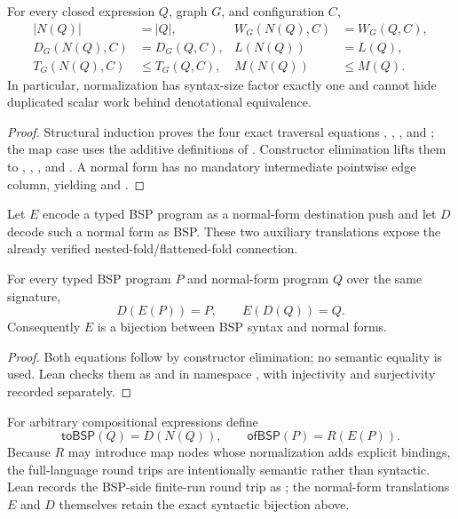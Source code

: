 \begin{theorem}
\label{thm:quantitative-normalization}
For every closed expression $Q$, graph $G$, and configuration $C$,
\[
\begin{aligned}
 |N(Q)| &= |Q|,&
 W_G(N(Q),C) &= W_G(Q,C),\\
 D_G(N(Q),C) &= D_G(Q,C),&
 L(N(Q)) &= L(Q),\\
 T_G(N(Q),C) &\leq T_G(Q,C),&
 M(N(Q)) &\leq M(Q).
\end{aligned}
\]
In particular, normalization has syntax-size factor exactly one and cannot
hide duplicated scalar work behind denotational equivalence.
\end{theorem}

\begin{proof}
Structural induction proves the four exact traversal equations
, ,
, and ; the map case
uses the additive definitions of .  Constructor elimination
lifts them to , ,
, and .  A normal form
has no mandatory intermediate pointwise edge column, yielding
 and
.
\end{proof}

Let $E$ encode a typed BSP program as a normal-form destination push and let
$D$ decode such a normal form as BSP.  These two auxiliary translations expose
the already verified nested-fold/flattened-fold connection.

\begin{theorem}
\label{thm:syntax-equivalence}
For every typed BSP program $P$ and normal-form \TA{} program $Q$ over the
same signature,
\[
 D(E(P))=P,\qquad E(D(Q))=Q.
\]
Consequently $E$ is a bijection between BSP syntax and \TA{} normal forms.
\end{theorem}

\begin{proof}
Both equations follow by constructor elimination; no semantic equality is
used.  Lean checks them as  and  in
namespace , with injectivity and surjectivity
recorded separately.
\end{proof}

For arbitrary compositional expressions define
\[
 \mathsf{toBSP}(Q)=D(N(Q)),\qquad
 \mathsf{ofBSP}(P)=R(E(P)).
\]
Because $R$ may introduce map nodes whose normalization adds explicit
bindings, the full-language round trips are intentionally semantic rather
than syntactic.  Lean records the BSP-side finite-run round trip as
; the normal-form translations $E$ and
$D$ themselves retain the exact syntactic bijection above.

